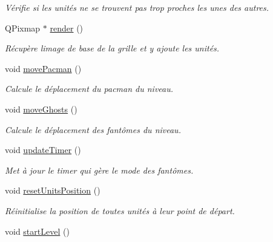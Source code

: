 \begin{DoxyCompactItemize}
\begin{DoxyCompactList}\small\item\em Vérifie si les unités ne se trouvent pas trop proches les unes des autres. \end{DoxyCompactList}\item 
Q\+Pixmap $\ast$ \hyperlink{class_level_ae13ed4f189fc75b8b1a98c378216af2c}{render} ()
\begin{DoxyCompactList}\small\item\em Récupère l\textquotesingle{}image de base de la grille et y ajoute les unités. \end{DoxyCompactList}\item 
\hypertarget{class_level_ac61a6b945f5947beed35fea97495c719}{}void \hyperlink{class_level_ac61a6b945f5947beed35fea97495c719}{move\+Pacman} ()\label{class_level_ac61a6b945f5947beed35fea97495c719}

\begin{DoxyCompactList}\small\item\em Calcule le déplacement du pacman du niveau. \end{DoxyCompactList}\item 
\hypertarget{class_level_a16b282122a4046e16e8b28bd1471b933}{}void \hyperlink{class_level_a16b282122a4046e16e8b28bd1471b933}{move\+Ghosts} ()\label{class_level_a16b282122a4046e16e8b28bd1471b933}

\begin{DoxyCompactList}\small\item\em Calcule le déplacement des fantômes du niveau. \end{DoxyCompactList}\item 
\hypertarget{class_level_afb52fc19c9f68243db489df978e142ed}{}void \hyperlink{class_level_afb52fc19c9f68243db489df978e142ed}{update\+Timer} ()\label{class_level_afb52fc19c9f68243db489df978e142ed}

\begin{DoxyCompactList}\small\item\em Met à jour le timer qui gère le mode des fantômes. \end{DoxyCompactList}\item 
\hypertarget{class_level_a8ff7672108dac0debe8d0c0dc1590f34}{}void \hyperlink{class_level_a8ff7672108dac0debe8d0c0dc1590f34}{reset\+Units\+Position} ()\label{class_level_a8ff7672108dac0debe8d0c0dc1590f34}

\begin{DoxyCompactList}\small\item\em Réinitialise la position de toutes unités à leur point de départ. \end{DoxyCompactList}\item 
\hypertarget{class_level_af9979f888060289a08dbc72dc7ab5573}{}void \hyperlink{class_level_af9979f888060289a08dbc72dc7ab5573}{start\+Level} ()\label{class_level_af9979f888060289a08dbc72dc7ab5573}


\end{DoxyCompactItemize}
